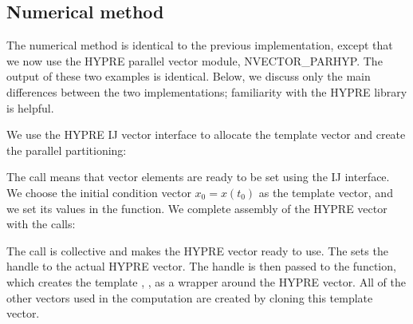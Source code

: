 \documentclass[letterpaper,10pt,english]{sphinxmanual}
\begin{document}
\subsection{Numerical method}
\label{\detokenize{c_parhyp:numerical-method}}
\sphinxAtStartPar
The numerical method is identical to the previous implementation,
except that we now use the HYPRE parallel vector module,
NVECTOR\_PARHYP.  The output of these two examples is identical.
Below, we discuss only the main differences between the two
implementations; familiarity with the HYPRE library is helpful.

\sphinxAtStartPar
We use the HYPRE IJ vector interface to allocate the template vector
and create the parallel partitioning:

\begin{sphinxVerbatim}[commandchars=\\\{\}]
\end{sphinxVerbatim}

\sphinxAtStartPar
The  call means that vector elements are ready to be set using
the IJ interface. We choose the initial condition vector \(x_0 =
x(t_0)\) as the template vector, and we set its values in the
 function. We complete assembly of the
HYPRE vector with the calls:

\begin{sphinxVerbatim}[commandchars=\\\{\}]
\end{sphinxVerbatim}

\sphinxAtStartPar
The  call is collective and makes the HYPRE vector ready to
use.  The sets the handle  to the actual HYPRE vector.  The
handle is then passed to the  function, which creates the
template , , as a wrapper around the HYPRE vector.
All of the other vectors used in the computation are created by
cloning this template vector.
\end{document}
